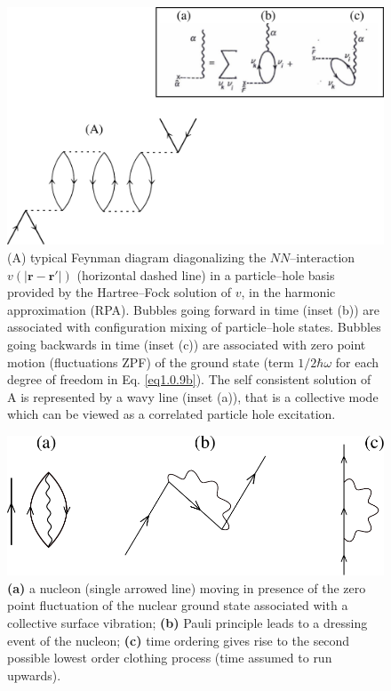 \documentclass[a4paper,11pt]{book}
\numberwithin{equation}{section}
\numberwithin{figure}{section}
\numberwithin{table}{section}
\begin{document}
\begin{figure}
\centerline {
\includegraphics*[width=12cm]{introduccion/figs/figpreface7}
}
\caption{(A) typical Feynman diagram diagonalizing the $NN$--interaction $v(|\mathbf r-\mathbf r'|)$ (horizontal dashed line) in a particle--hole basis provided by the Hartree--Fock solution of $v$, in the harmonic approximation (RPA). Bubbles going forward in time (inset (b)) are associated with configuration mixing of particle--hole states. Bubbles going backwards in time (inset (c)) are associated with zero point motion (fluctuations ZPF) of the ground state (term $1/2\hbar\omega$ for each degree of freedom in Eq. \ref{eq1.0.9b}). The self consistent solution of A is represented by a wavy line (inset (a)), that is a collective mode which can be viewed as a correlated particle hole excitation.}
\label{fig1.0.7}
\end{figure}
\begin{figure}
\centerline {
\includegraphics*[width=12cm]{introduccion/figs/figpreface8}
}
\caption{\textbf{(a)} a nucleon (single arrowed line) moving in presence of the zero point fluctuation of the nuclear ground state associated with a collective surface vibration; \textbf{(b)} Pauli principle leads to a dressing event of the nucleon; \textbf{(c)} time ordering gives rise to the second possible lowest order clothing process (time assumed to run upwards).}
\label{fig1.0.8}
\end{figure}
\end{document}
